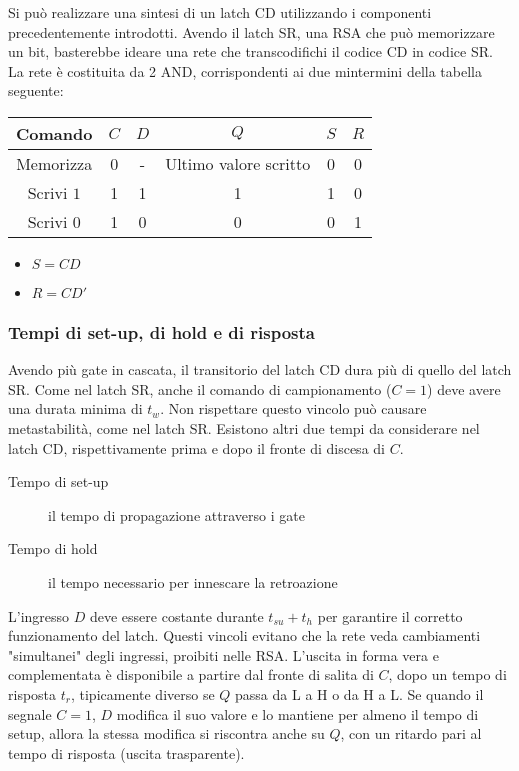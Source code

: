 \documentclass{article}
\begin{document}
Si può realizzare una sintesi di un latch CD utilizzando i componenti precedentemente introdotti.
Avendo il latch SR, una RSA che può memorizzare un bit, basterebbe ideare una rete che transcodifichi il codice CD in codice SR.
La rete è costituita da 2 AND, corrispondenti ai due mintermini della tabella seguente:

\begin{center}
\begin{tabular}{ |c|c|c|c|c|c| }
\hline
Comando & $C$ & $D$ & $Q$ & $S$ & $R$ \\
\hline
\hline
Memorizza & 0 & - & Ultimo valore scritto & 0 & 0 \\
Scrivi $1$ & 1 & 1 & 1 & 1 & 0 \\
Scrivi $0$ & 1 & 0 & 0 & 0 & 1 \\
\hline
\end{tabular}
\end{center}

\begin{itemize}
    \item $S = CD$
    \item $R = CD'$
\end{itemize}

\subsubsection{Tempi di set-up, di hold e di risposta}

Avendo più gate in cascata, il transitorio del latch CD dura più di quello del latch SR.
Come nel latch SR, anche il comando di campionamento ($C=1$) deve avere una durata minima di $t_w$.
Non rispettare questo vincolo può causare metastabilità, come nel latch SR.
Esistono altri due tempi da considerare nel latch CD, rispettivamente prima e dopo il fronte di discesa di $C$.

\begin{description}
    \item[Tempo di set-up] il tempo di propagazione attraverso i gate
    \item[Tempo di hold] il tempo necessario per innescare la retroazione
\end{description}

\noindent
L'ingresso $D$ deve essere costante durante $t_{su}+t_h$ per garantire il corretto funzionamento del latch.
Questi vincoli evitano che la rete veda cambiamenti "simultanei" degli ingressi, proibiti nelle RSA.
L'uscita in forma vera e complementata è disponibile a partire dal fronte di salita di $C$, dopo un tempo di risposta $t_r$, tipicamente diverso se $Q$ passa da L a H o da H a L.
Se quando il segnale $C=1$, $D$ modifica il suo valore e lo mantiene per almeno il tempo di setup, allora la stessa modifica si riscontra anche su $Q$, con un ritardo pari al tempo di risposta (uscita trasparente).
\end{document}

